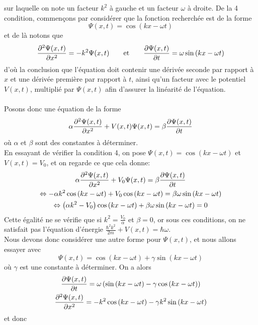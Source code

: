 sur laquelle on note un facteur $k^2$ à gauche et un facteur $\omega$ à droite.
De la 4\ieme{} condition, commençons par considérer que la fonction recherchée est de la forme
\[
    \Psi (x,t) = \cos \left( kx - \omega t \right)
\]
et de là notons que
\[
    \pdv[2]{\Psi (x,t)}{x} = - k^2 \Psi (x,t) \qquad \text{et} \qquad \pdv{\Psi (x,t)}{t} = \omega \sin \left( kx - \omega t \right)
\]
d'où la conclusion que l'équation doit contenir une dérivée seconde par rapport à $x$ et une dérivée première par
rapport à $t$, ainsi qu'un facteur avec le potentiel $V(x,t)$, multiplié par $\Psi (x,t)$ afin d'assurer
la linéarité de l'équation.\\ \\
Posons donc une équation de la forme
\[
    \alpha \pdv[2]{\Psi (x,t)}{x} + V(x,t) \Psi (x,t) = \beta \pdv{\Psi (x,t)}{t}
\]
où $\alpha$ et $\beta$ sont des constantes à déterminer.\\
En essayant de vérifier la condition 4, on pose $\Psi (x,t) = \cos \left( kx - \omega t \right)$ et $V(x,t)=V_0$,
et on regarde ce que cela donne:
\begin{gather*}
    \alpha \pdv[2]{\Psi (x,t)}{x} + V_0 \Psi (x,t) = \beta \pdv{\Psi (x,t)}{t} \\
    \Leftrightarrow - \alpha k^2 \cos \left( kx - \omega t \right) + V_0 \cos \left( kx - \omega t \right) =
    \beta \omega \sin \left( kx - \omega t \right)\\
    \Leftrightarrow \left( \alpha k^2  - V_0 \right) \cos \left( kx - \omega t \right) + \beta \omega \sin \left( kx - \omega t \right) = 0\\
\end{gather*}
Cette égalité ne se vérifie que si $k^2 = \frac{V_0}{\alpha}$ et $\beta = 0$, or sous ces conditions, on ne satisfait pas
l'équation d'énergie $\frac{\hbar^2 k^2}{2m} + V(x,t) = \hbar \omega$.\\
Nous devons donc considérer une autre forme pour $\Psi (x,t)$, et nous allons essayer avec
\[
    \Psi (x,t) = \cos \left( kx - \omega t \right) + \gamma \sin \left( kx - \omega t \right)
\]
où $\gamma$ est une constante à déterminer.
On a alors
\begin{gather*}
    \pdv{\Psi (x,t)}{t} = \omega \left( \sin \left( kx - \omega t \right) - \gamma \cos \left( kx - \omega t \right) \right)\\
    \pdv[2]{\Psi (x,t)}{x} = - k^2 \cos \left( kx - \omega t \right) - \gamma k^2 \sin \left( kx - \omega t \right)
\end{gather*}
et donc
